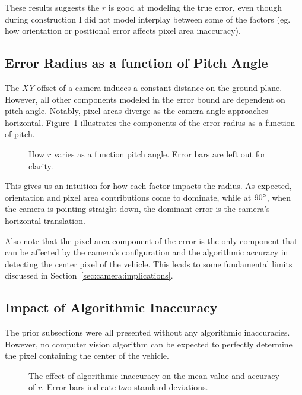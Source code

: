\documentclass[a4paper,12pt,twoside,openright]{report}
\begin{document}
These results suggests the $r$ is good at modeling the true error, even though during construction
I did not model interplay between some of the factors (eg. how orientation 
or positional error affects pixel area inaccuracy).

\subsection{Error Radius as a function of Pitch Angle}

The \textit{XY} offset of a camera induces a constant distance on the ground plane. However,
all other components modeled in the error bound are dependent on pitch angle. Notably,
pixel areas diverge as the camera angle approaches horizontal. Figure~\ref{fig:camera:radius versus pitch}
illustrates the components of the error radius as a function of pitch.

\begin{figure}[htb]
    \begin{center}
        
    \end{center}
    \caption[$r$ as a Function of Pitch Angle]{How $r$ varies as a function pitch angle. Error bars are left out for clarity.}
    \label{fig:camera:radius versus pitch}
\end{figure}


This gives us an intuition for how each factor impacts the radius.
As expected, orientation and pixel area contributions
come to dominate, while at $90\degree$, when the camera is pointing straight down, the dominant
error is the camera's horizontal translation.

Also note that the pixel-area component of the error is the only component that
can be affected by the camera's configuration and the algorithmic 
accuracy in detecting the center pixel of the vehicle. This leads
to some fundamental limits discussed in Section~\ref{sec:camera:implications}.

\subsection{Impact of Algorithmic Inaccuracy}

The prior subsections were all presented without any algorithmic inaccuracies.
However, no computer vision algorithm can be expected to perfectly determine
the pixel containing the center of the vehicle.

\begin{figure}[htb]
    \begin{center}
        
    \end{center}
    \caption[Effect of Algorithmic Inaccuracy]{The effect of algorithmic inaccuracy on the mean value and accuracy of $r$. Error bars indicate two standard deviations.}
    \label{fig:camera:algorithm effect}
\end{figure}
\end{document}
